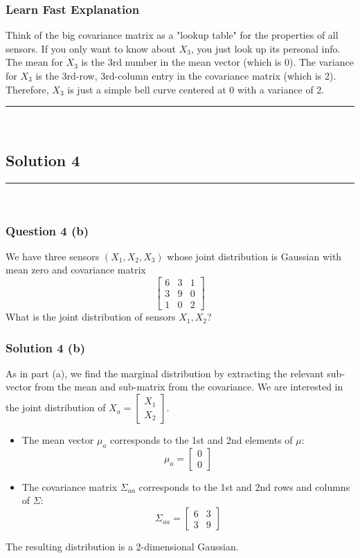 \documentclass{article}
\begin{document}
\subsubsection*{Learn Fast Explanation}
Think of the big covariance matrix as a "lookup table" for the properties of all sensors. If you only want to know about $X_3$, you just look up its personal info. The mean for $X_3$ is the 3rd number in the mean vector (which is 0). The variance for $X_3$ is the 3rd-row, 3rd-column entry in the covariance matrix (which is 2). Therefore, $X_3$ is just a simple bell curve centered at 0 with a variance of 2.

\noindent\rule{\textwidth}{0.4pt}\\

\newpage

\subsection*{Solution 4}
\noindent\rule{\textwidth}{0.4pt}\\
\subsubsection*{Question 4 (b)}
\begin{flushleft}
    We have three sensors $(X_1, X_2, X_3)$ whose joint distribution is Gaussian with mean zero and covariance matrix 
    \[
    \begin{bmatrix}
    6 & 3 & 1 \\
    3 & 9 & 0 \\
    1 & 0 & 2
    \end{bmatrix}
    \]
    What is the joint distribution of sensors $X_1, X_2$? 
\end{flushleft}

\subsubsection*{Solution 4 (b)}
As in part (a), we find the marginal distribution by extracting the relevant sub-vector from the mean and sub-matrix from the covariance.
We are interested in the joint distribution of $X_a = \begin{bmatrix} X_1 \\ X_2 \end{bmatrix}$.
\begin{itemize}
    \item The mean vector $\mu_a$ corresponds to the 1st and 2nd elements of $\mu$:
    $$ \mu_a = \begin{bmatrix} 0 \\ 0 \end{bmatrix} $$
    \item The covariance matrix $\Sigma_{aa}$ corresponds to the 1st and 2nd rows and columns of $\Sigma$:
    $$ \Sigma_{aa} = \begin{bmatrix} 6 & 3 \\ 3 & 9 \end{bmatrix} $$
\end{itemize}
The resulting distribution is a 2-dimensional Gaussian.
\end{document}

